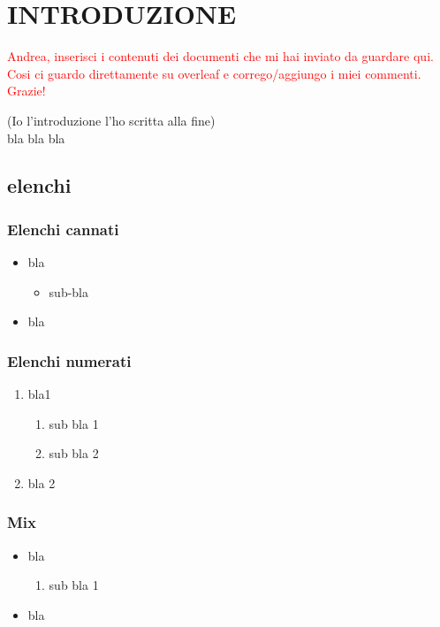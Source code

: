 \documentclass[12pt,a4paper,twoside]{book}
\begin{document}
\setcounter{chapter}{-1}
\raggedbottom
\chapter{INTRODUZIONE} \label{chap:intro}
\pagestyle{plain}
\setcounter{page}{1}

\textcolor{red}{\Large Andrea, inserisci i contenuti dei documenti che mi hai inviato da guardare qui. Cosi ci guardo direttamente su overleaf e corrego/aggiungo i miei commenti. Grazie!}

(Io l'introduzione l'ho scritta alla fine)\\
bla bla bla
\section{elenchi}
\subsection{Elenchi cannati}
\begin{itemize}
    \item bla
    \begin{itemize}
        \item sub-bla
    \end{itemize}
    \item bla
\end{itemize}

\subsection{Elenchi numerati}
\begin{enumerate}
    \item bla1
    \begin{enumerate}
        \item sub bla 1
        \item sub bla 2
    \end{enumerate}
    \item bla 2
\end{enumerate}

\subsection{Mix}
\begin{itemize}
    \item bla
    \begin{enumerate}
        \item sub bla 1
    \end{enumerate}
    \item bla
\end{itemize}
\end{document}
